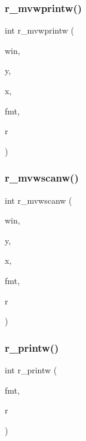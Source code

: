 \mbox{\label{C-macros_8c_aee7cd6844203dd1d2b386c1a42fb97bb}} 
\subsubsection{\texorpdfstring{r\+\_\+mvwprintw()}{r\_mvwprintw()}}
{\footnotesize\ttfamily int r\+\_\+mvwprintw (\begin{DoxyParamCaption}\item[{W\+I\+N\+D\+OW $\ast$}]{win,  }\item[{int}]{y,  }\item[{int}]{x,  }\item[{const char $\ast$}]{fmt,  }\item[{float}]{r }\end{DoxyParamCaption})}

\mbox{\label{C-macros_8c_a7db28527589679384ae2e79c665eddb4}} 
\subsubsection{\texorpdfstring{r\+\_\+mvwscanw()}{r\_mvwscanw()}}
{\footnotesize\ttfamily int r\+\_\+mvwscanw (\begin{DoxyParamCaption}\item[{W\+I\+N\+D\+OW $\ast$}]{win,  }\item[{int}]{y,  }\item[{int}]{x,  }\item[{char $\ast$}]{fmt,  }\item[{float $\ast$}]{r }\end{DoxyParamCaption})}

\mbox{\label{C-macros_8c_af5706198a4ac8d519c30824899cd04eb}} 
\subsubsection{\texorpdfstring{r\+\_\+printw()}{r\_printw()}}
{\footnotesize\ttfamily int r\+\_\+printw (\begin{DoxyParamCaption}\item[{const char $\ast$}]{fmt,  }\item[{float}]{r }\end{DoxyParamCaption})}

